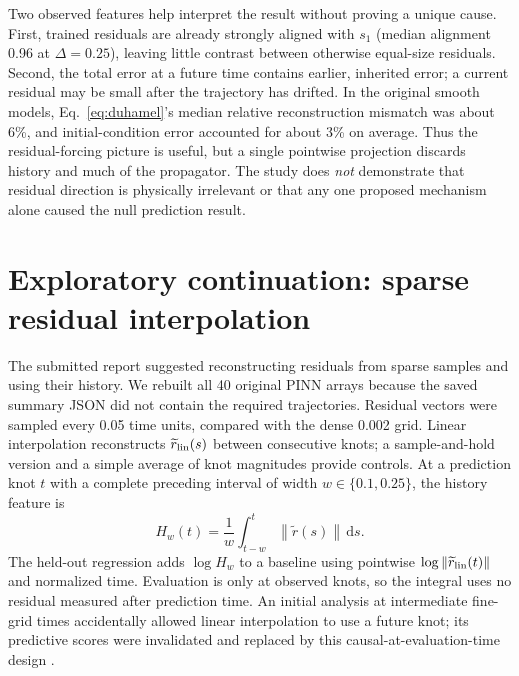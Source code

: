 \documentclass[11pt,a4paper]{article}
\newcommand{\norm}[1]{\left\lVert #1\right\rVert}
\newcommand{\dd}{\,\mathrm{d}}
\begin{document}
Two observed features help interpret the result without proving a unique cause. First, trained residuals are already strongly aligned with $s_1$ (median alignment 0.96 at $\Delta=0.25$), leaving little contrast between otherwise equal-size residuals. Second, the total error at a future time contains earlier, inherited error; a current residual may be small after the trajectory has drifted. In the original smooth models, Eq.~\eqref{eq:duhamel}'s median relative reconstruction mismatch was about 6\%, and initial-condition error accounted for about 3\% on average. Thus the residual-forcing picture is useful, but a single pointwise projection discards history and much of the propagator. The study does \emph{not} demonstrate that residual direction is physically irrelevant or that any one proposed mechanism alone caused the null prediction result.

\section{Exploratory continuation: sparse residual interpolation}
The submitted report suggested reconstructing residuals from sparse samples and using their history. We rebuilt all 40 original PINN arrays because the saved summary JSON did not contain the required trajectories. Residual vectors were sampled every 0.05 time units, compared with the dense 0.002 grid. Linear interpolation reconstructs $\widetilde r_{\rm lin}(s)$ between consecutive knots; a sample-and-hold version and a simple average of knot magnitudes provide controls. At a prediction knot $t$ with a complete preceding interval of width $w\in\{0.1,0.25\}$, the history feature is
\begin{equation}\label{eq:trailing}
H_w(t)=\frac1w\int_{t-w}^{t}\norm{\widetilde r(s)}\dd s.
\end{equation}
The held-out regression adds $\log H_w$ to a baseline using pointwise $\log\norm{\widetilde r_{\rm lin}(t)}$ and normalized time. Evaluation is only at observed knots, so the integral uses no residual measured after prediction time. An initial analysis at intermediate fine-grid times accidentally allowed linear interpolation to use a future knot; its predictive scores were invalidated and replaced by this causal-at-evaluation-time design \cite{interpolation}.
\end{document}
